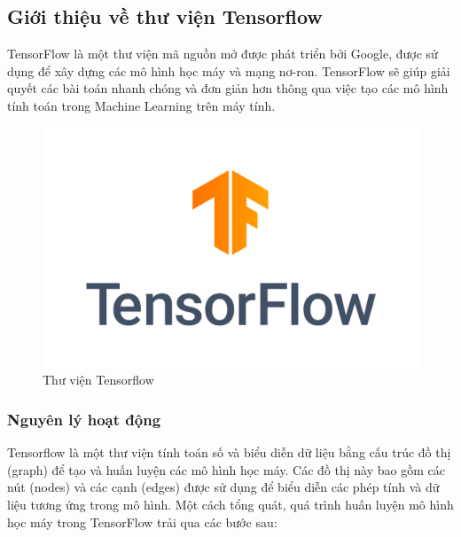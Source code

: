 \subsection{Giới thiệu về thư viện Tensorflow}
\indent TensorFlow là một thư viện mã nguồn mở được phát triển bởi Google, được sử dụng để xây dựng các mô hình học máy và mạng nơ-ron. TensorFlow sẽ giúp giải quyết các bài toán nhanh chóng và đơn giản hơn thông qua việc tạo các mô hình tính toán trong Machine Learning trên máy tính.
\begin{figure}[H]
    \centering
    \includegraphics[width=\textwidth,height=\textheight,keepaspectratio]{Images/Theoretical basis/TensorFlow_logo.png}
    \caption{Thư viện Tensorflow}
    \label{fig:enter-label}
\end{figure}
\subsubsection{Nguyên lý hoạt động}
\indent Tensorflow là một thư viện tính toán số và biểu diễn dữ liệu bằng cấu trúc đồ thị (graph) để tạo và huấn luyện các mô hình học máy. Các đồ thị này bao gồm các nút (nodes) và các cạnh (edges) được sử dụng để biểu diễn các phép tính và dữ liệu tương ứng trong mô hình. Một cách tổng quát, quá trình huấn luyện mô hình học máy trong TensorFlow trải qua các bước sau:

